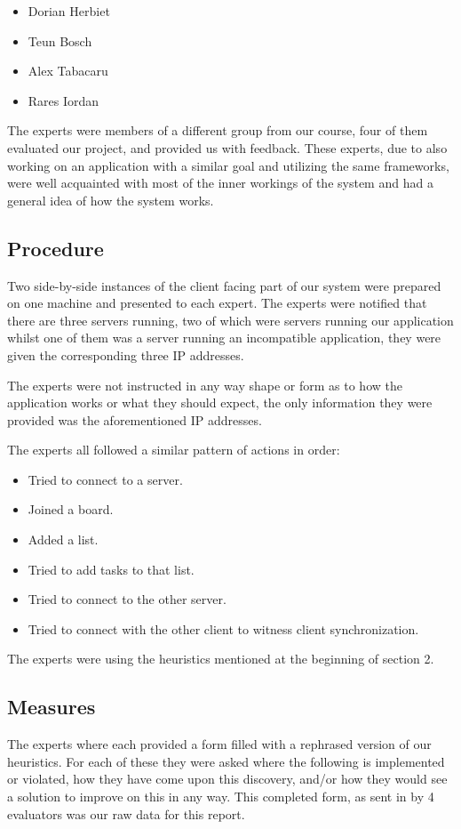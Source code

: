 \begin{itemize}
    \item Dorian Herbiet
    \item Teun Bosch
    \item Alex Tabacaru
    \item Rares Iordan
\end{itemize}

The experts were members of a different group from our course, four of them evaluated our project, and provided us with feedback. These experts, due to also working on an application with a similar goal and utilizing the same frameworks, were well acquainted with most of the inner workings of the system and had a general idea of how the system works.


\subsection{Procedure}

Two side-by-side instances of the client facing part of our system were prepared on one machine and presented to each expert. The experts were notified that there are three servers running, two of which were servers running our application whilst one of them was a server running an incompatible application, they were given the corresponding three IP addresses.

The experts were not instructed in any way shape or form as to how the application works or what they should expect, the only information they were provided was the aforementioned IP addresses.

The experts all followed a similar pattern of actions in order:

\begin{itemize}
    \item Tried to connect to a server.
    \item Joined a board.
    \item Added a list.
    \item Tried to add tasks to that list.
    \item Tried to connect to the other server.
    \item Tried to connect with the other client to witness client synchronization.
\end{itemize}

The experts were using the heuristics mentioned at the beginning of section 2.

\subsection{Measures}

The experts where each provided a form filled with a rephrased version of our heuristics. For each of these they were asked where the following is implemented or violated, how they have come upon this discovery, and/or how they would see a solution to improve on this in any way. This completed form, as sent in by 4 evaluators was our raw data for this report.